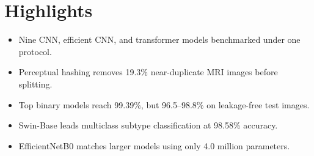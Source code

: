 \documentclass[12pt]{article}
\begin{document}
\section*{Highlights}

\begin{itemize}
\item Nine CNN, efficient CNN, and transformer models benchmarked under one protocol.
\item Perceptual hashing removes 19.3\% near-duplicate MRI images before splitting.
\item Top binary models reach 99.39\%, but 96.5--98.8\% on leakage-free test images.
\item Swin-Base leads multiclass subtype classification at 98.58\% accuracy.
\item EfficientNetB0 matches larger models using only 4.0 million parameters.
\end{itemize}
\end{document}
